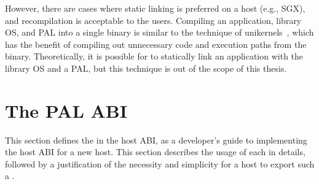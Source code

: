 However, there are cases where static linking is preferred on a host (e.g., SGX), and recompilation is acceptable to the users.
Compiling an application, library OS, and PAL
into a single binary is similar to the technique of unikernels~\cite{unikernels},
which has the benefit of compiling out unnecessary code and execution paths
from the binary. 
Theoretically, it is possible for \graphene{} to statically link an application with the library OS and a PAL,
but this technique is out of the scope of this thesis.


\section{The PAL ABI}

This section defines the \hostapis{}
in the host ABI,
as a developer's guide to implementing the host ABI for a new host.
This section describes 
the usage of each \hostapi{} in details,
followed by a justification of the necessity and simplicity
for a host to export such a \hostapi{}.


